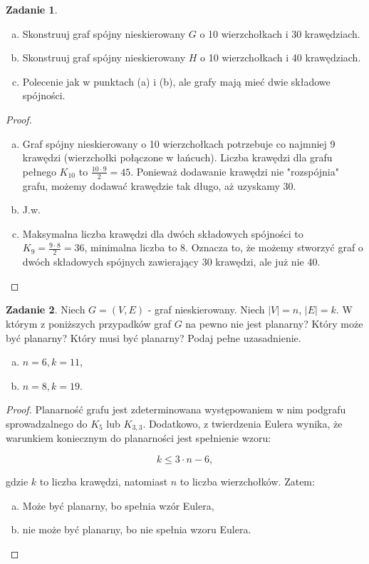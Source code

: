 \documentclass[11pt]{article}
\theoremstyle{definition}
\newtheorem{zadanie}{Zadanie}
\begin{document}
\begin{zadanie}
    \begin{enumerate}[a)]
        \item Skonstruuj graf spójny nieskierowany $G$ o 10 wierzchołkach i 30 krawędziach.
        \item Skonstruuj graf spójny nieskierowany $H$ o 10 wierzchołkach i 40 krawędziach.
        \item Polecenie jak w punktach (a) i (b), ale grafy mają mieć dwie składowe spójności.
    \end{enumerate}
\end{zadanie}
\begin{proof}
    \begin{enumerate}[a)]
        \item Graf spójny nieskierowany o 10 wierzchołkach potrzebuje co najmniej 9 krawędzi (wierzchołki połączone w łańcuch). Liczba krawędzi dla grafu pełnego $K_{10}$ to $\frac{10\cdot9}2 = 45.$ Ponieważ dodawanie krawędzi nie "rozspójnia" grafu, możemy dodawać krawędzie tak długo, aż uzyskamy 30.
        \item J.w.
        \item Maksymalna liczba krawędzi dla dwóch składowych spójności to $K_9 = \frac{9\cdot8}2 = 36$, minimalna liczba to 8. Oznacza to, że możemy stworzyć graf o dwóch składowych spójnych zawierający 30 krawędzi, ale już nie 40.
    \end{enumerate}
\end{proof}
\begin{zadanie}
    Niech $G=(V,E)$ - graf nieskierowany. Niech $|V| = n$, $|E| = k$. W którym z poniższych przypadków graf $G$ na pewno nie jest planarny? Który może być planarny? Który musi być planarny? Podaj pełne
    uzasadnienie.

    \begin{enumerate}[a)]
        \item $n=6, k=11$,
        \item $n=8, k=19$.
    \end{enumerate}

\end{zadanie}
\begin{proof}
    Planarność grafu jest zdeterminowana występowaniem w nim podgrafu sprowadzalnego do $K_5$ lub $K_{3,3}$. Dodatkowo, z twierdzenia Eulera wynika, że warunkiem koniecznym do planarności jest spełnienie wzoru:

    $$ k\leq 3\cdot n - 6,$$

    gdzie $k$ to liczba krawędzi, natomiast $n$ to liczba wierzchołków. Zatem:

    \begin{enumerate}[a)]
        \item Może być planarny, bo spełnia wzór Eulera,
        \item nie może być planarny, bo nie spełnia wzoru Eulera.
    \end{enumerate}
\end{proof}
\end{document}
